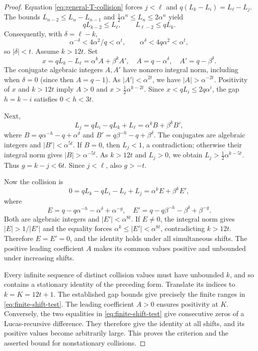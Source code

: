 \documentclass[11pt]{article}
\begin{document}
\begin{proof}
Equation \eqref{eq:general-T-collision} forces
$j<\ell$ and
$q(L_k-L_i)=L_\ell-L_j$.
The bounds $L_{n-2}\le L_n-L_{n-1}$
and $\frac12\alpha^n\le L_n\le2\alpha^n$ yield
\[
qL_{k-2}\le L_\ell,\qquad
L_{\ell-2}\le qL_k.
\]
Consequently, with $\delta=\ell-k$,
\[
\alpha^{-\delta}<4\alpha^2/q<\alpha^t,
\qquad
\alpha^\delta<4q\alpha^2<\alpha^t,
\]
so $|\delta|<t$.
Assume $k>12t$.
Set
\[
x=qL_k-L_\ell
=\alpha^k A+\beta^k A',
\quad
A=q-\alpha^\delta,\quad A'=q-\beta^\delta.
\]
The conjugate algebraic integers $A,A'$ have
nonzero integral norm, including when $\delta=0$
(since then $A=q-1$).
As $|A'|<\alpha^{2t}$,
we have $|A|>\alpha^{-2t}$.
Positivity of $x$ and $k>12t$ imply
$A>0$ and $x>\frac12\alpha^{k-2t}$.
Since $x<qL_i\le2q\alpha^i$,
the gap $h=k-i$ satisfies $0<h<3t$.

Next,
\[
L_j=qL_i-qL_k+L_\ell
=\alpha^k B+\beta^k B',
\]
where $B=q\alpha^{-h}-q+\alpha^\delta$
and $B'=q\beta^{-h}-q+\beta^\delta$.
The conjugates are algebraic integers and
$|B'|<\alpha^{5t}$. If $B=0$,
then $L_j<1$, a contradiction;
otherwise their integral norm gives
$|B|>\alpha^{-5t}$.
As $k>12t$ and $L_j>0$,
we obtain $L_j>\frac12\alpha^{k-5t}$.
Thus $g=k-j<6t$.
Since $j<\ell$, also $g>-t$.

Now the collision is
\[
0=qL_k-qL_i-L_\ell+L_j
=\alpha^k E+\beta^k E',
\]
where
\[
E=q-q\alpha^{-h}-\alpha^\delta+\alpha^{-g},
\quad
E'=q-q\beta^{-h}-\beta^\delta+\beta^{-g}.
\]
Both are algebraic integers and
$|E'|<\alpha^{8t}$.
If $E\ne0$, the integral norm gives
$|E|>1/|E'|$ and the equality forces
$\alpha^k\le |E'|<\alpha^{8t}$,
contradicting $k>12t$.
Therefore $E=E'=0$, and the identity
holds under all simultaneous shifts.
The positive leading coefficient $A$
makes its common values positive and unbounded
under increasing shifts.

Every infinite sequence of distinct collision
values must have unbounded $k$, and so contains
a stationary identity of the preceding form.
Translate its indices to $k=K=12t+1$.
The established gap bounds give precisely
the finite ranges in \eqref{eq:finite-shift-test}.
The leading coefficient $A>0$ ensures
positivity at $K$. Conversely, the two
equalities in \eqref{eq:finite-shift-test}
give consecutive zeros of a Lucas-recursive
difference. They therefore give the identity
at all shifts, and its positive values become
arbitrarily large. This proves the criterion
and the asserted bound for nonstationary collisions.
\end{proof}
\end{document}
